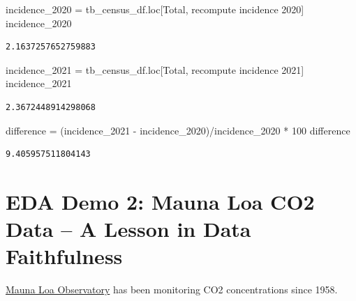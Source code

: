 \documentclass[
  letterpaper,
  DIV=11,
  numbers=noendperiod]{scrreprt}
\newenvironment{Shaded}{\begin{snugshade}}{\end{snugshade}}
\newcommand{\DecValTok}[1]{\textcolor[rgb]{0.68,0.00,0.00}{#1}}
\newcommand{\NormalTok}[1]{\textcolor[rgb]{0.00,0.23,0.31}{#1}}
\newcommand{\OperatorTok}[1]{\textcolor[rgb]{0.37,0.37,0.37}{#1}}
\newcommand{\StringTok}[1]{\textcolor[rgb]{0.13,0.47,0.30}{#1}}
\begin{document}
\begin{Shaded}
\begin{Highlighting}[]
\NormalTok{incidence\_2020 }\OperatorTok{=}\NormalTok{ tb\_census\_df.loc[}\StringTok{\textquotesingle{}Total\textquotesingle{}}\NormalTok{, }\StringTok{\textquotesingle{}recompute incidence 2020\textquotesingle{}}\NormalTok{]}
\NormalTok{incidence\_2020}
\end{Highlighting}
\end{Shaded}

\begin{verbatim}
2.1637257652759883
\end{verbatim}

\begin{Shaded}
\begin{Highlighting}[]
\NormalTok{incidence\_2021 }\OperatorTok{=}\NormalTok{ tb\_census\_df.loc[}\StringTok{\textquotesingle{}Total\textquotesingle{}}\NormalTok{, }\StringTok{\textquotesingle{}recompute incidence 2021\textquotesingle{}}\NormalTok{]}
\NormalTok{incidence\_2021}
\end{Highlighting}
\end{Shaded}

\begin{verbatim}
2.3672448914298068
\end{verbatim}

\begin{Shaded}
\begin{Highlighting}[]
\NormalTok{difference }\OperatorTok{=}\NormalTok{ (incidence\_2021 }\OperatorTok{{-}}\NormalTok{ incidence\_2020)}\OperatorTok{/}\NormalTok{incidence\_2020 }\OperatorTok{*} \DecValTok{100}
\NormalTok{difference}
\end{Highlighting}
\end{Shaded}

\begin{verbatim}
9.405957511804143
\end{verbatim}

\hypertarget{eda-demo-2-mauna-loa-co2-data-a-lesson-in-data-faithfulness}{%
\section{EDA Demo 2: Mauna Loa CO2 Data -- A Lesson in Data
Faithfulness}\label{eda-demo-2-mauna-loa-co2-data-a-lesson-in-data-faithfulness}}

\href{https://gml.noaa.gov/ccgg/trends/data.html}{Mauna Loa Observatory}
has been monitoring CO2 concentrations since 1958.
\end{document}
